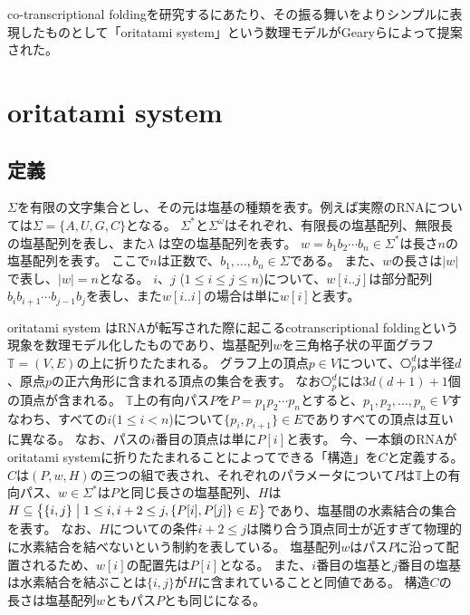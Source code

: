 \documentclass[a4,11pt]{article}
\begin{document}
co-transcriptional foldingを研究するにあたり、その振る舞いをよりシンプルに表現したものとして「oritatami system」という数理モデルがGearyらによって提案された\cite{GeMeScSe2019}。





\section{oritatami system}


\subsection{定義}
$\Sigma$を有限の文字集合とし、その元は塩基の種類を表す。例えば実際のRNAについては$\Sigma = \{ A,U,G,C \}$となる。
$\Sigma^*$と$\Sigma^\omega$はそれぞれ、有限長の塩基配列、無限長の塩基配列を表し、また$\lambda$ は空の塩基配列を表す。
$w = b_1 b_2 \cdots b_n \in \Sigma^*$は長さ$n$の塩基配列を表す。
ここで$n$は正数で、$b_1, \ldots, b_n \in \Sigma$である。
また、$w$の長さは$|w|$で表し、$|w| = n$となる。
$i$、$j$ ($1 \le i \le j \le n$)について、$w[i..j]$は部分配列$b_i b_{i+1} \cdots b_{j-1} b_j$を表し、また$w[i..i]$の場合は単に$w[i]$と表す。

oritatami system はRNAが転写された際に起こるcotranscriptional foldingという現象を数理モデル化したものであり、塩基配列$w$を三角格子状の平面グラフ$\mathbb{T} = (V, E)$の上に折りたたまれる。
グラフ上の頂点$p \in V$について、$\hexagon_p^d$は半径$d$、原点$p$の正六角形に含まれる頂点の集合を表す。
なお$\hexagon_p^d$には$3d(d+1)+1$個の頂点が含まれる。
$\mathbb{T}$上の有向パス$P$を$P = p_1 p_2 \cdots p_n$とすると、$p_1, p_2, \ldots, p_n \in V$すなわち、すべての$i $($1 \le i < n$)について$\{p_i, p_{i+1}\} \in E$でありすべての頂点は互いに異なる。
なお、パスの$i$番目の頂点は単に$P[i]$と表す。
今、一本鎖のRNAがoritatami systemに折りたたまれることによってできる「構造」を$C$と定義する。
$C$は$(P, w, H)$の三つの組で表され、それぞれのパラメータについて$P$は$\mathbb{T}$上の有向パス、$w \in \Sigma^*$は$P$と同じ長さの塩基配列、$H$は$H \subseteq \bigl\{\{i, j\} \bigm| 1 \le i, i+2 \le j, \{P[i], P[j]\} \in E \bigr\}$であり、塩基間の水素結合の集合を表す。
なお、$H$についての条件$i+2 \le j$は隣り合う頂点同士が近すぎて物理的に水素結合を結べないという制約を表している。
塩基配列$w$はパス$P$に沿って配置されるため、$w[i]$の配置先は$P[i]$となる。
また、$i$番目の塩基と$j$番目の塩基は水素結合を結ぶことは$\{i, j\}$が$H$に含まれていることと同値である。
構造$C$の長さは塩基配列$w$ともパス$P$とも同じになる。
\end{document}
